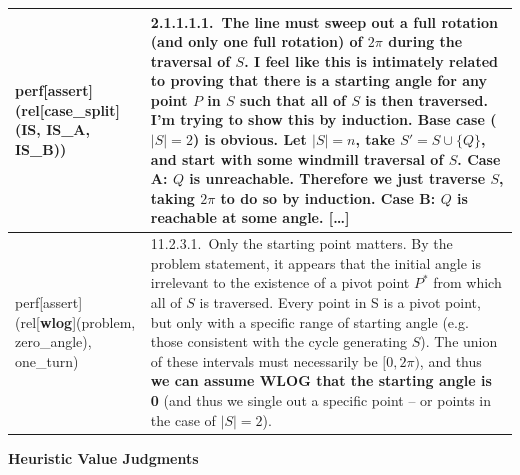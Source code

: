 \documentclass[smallextended,oneside]{svjour3}       %
\newcounter{turn}
\begin{document}
\begin{tabular}{|p{}|p{}|}
perf[assert](rel[\textbf{case_split}](IS, IS_A, IS_B)) & 2.1.1.1.1.~The line must sweep out a full rotation (and only one full rotation) of $2\pi$ during the traversal of $S$. I feel like this is intimately related to proving that there is a starting angle for any point $P$ in $S$ such that all of $S$ is then traversed. I'm trying to show this by induction. Base case ($|S|=2$) is obvious. \textbf{Let $|S| = n$, take $S' = S \cup \{Q\}$, and start with some windmill traversal of $S$.} \textbf{Case A:} $Q$ is unreachable. Therefore we just traverse $S$, taking $2\pi$ to do so by induction. \textbf{Case B:} $Q$ is reachable at some angle. [\ldots] \\ \hline
perf[assert](rel[\textbf{wlog}](problem, zero_angle), one_turn) & 11.2.3.1.~Only the starting point matters. By the problem statement, it appears that the initial angle is irrelevant to the existence of a pivot point $P^*$ from which all of $S$ is traversed. Every point in S is a pivot point, but only with a specific range of starting angle (e.g. those consistent with the cycle generating $S$). The union of these intervals must necessarily be $[0,2\pi)$, and thus \textbf{we can assume WLOG that the starting angle is 0} (and thus we single out a specific point -- or points in the case of $|S| = 2$).\\
\hline
\end{tabular}

\newpage

{\centering
\textbf{Heuristic Value Judgments} 

\par}

\smallskip
\end{document}
